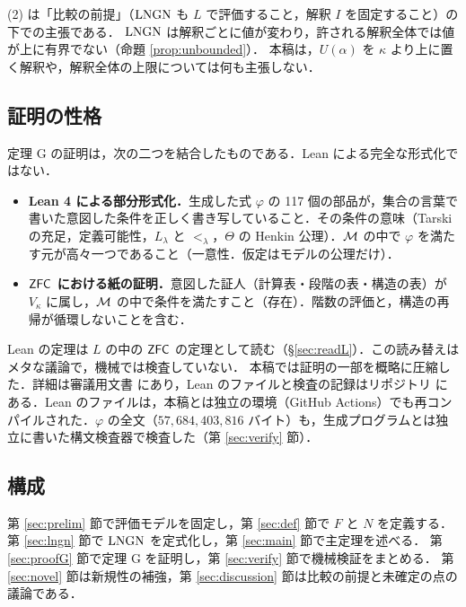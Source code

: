 (2) は「比較の前提」（$\mathrm{LNGN}$ も $L$ で評価すること，解釈 $I$ を固定すること）の下での主張である．
$\mathrm{LNGN}$ は解釈ごとに値が変わり，許される解釈全体では値が上に有界でない（命題 \ref{prop:unbounded}）．
本稿は，$U(\alpha)$ を $\kappa$ より上に置く解釈や，解釈全体の上限については何も主張しない．

\subsection{証明の性格}
定理 G の証明は，次の二つを結合したものである．Lean による完全な形式化ではない．
\begin{itemize}
\item \textbf{Lean 4 による部分形式化．}生成した式 $\varphi$ の 117 個の部品が，集合の言葉で書いた意図した条件を正しく書き写していること．その条件の意味（Tarski の充足，定義可能性，$L_\lambda$ と $<_\lambda$，$\Theta$ の Henkin 公理）．$\mathcal{M}$ の中で $\varphi$ を満たす元が高々一つであること（一意性．仮定はモデルの公理だけ）．
\item \textbf{$\mathsf{ZFC}$ における紙の証明．}意図した証人（計算表・段階の表・構造の表）が $V_\kappa$ に属し，$\mathcal{M}$ の中で条件を満たすこと（存在）．階数の評価と，構造の再帰が循環しないことを含む．
\end{itemize}
Lean の定理は $L$ の中の $\mathsf{ZFC}$ の定理として読む（\S\ref{sec:readL}）．この読み替えはメタな議論で，機械では検査していない．
本稿では証明の一部を概略に圧縮した．詳細は審議用文書 \cite{doc} にあり，Lean のファイルと検査の記録はリポジトリ \cite{repo} にある．Lean のファイルは，本稿とは独立の環境（GitHub Actions）でも再コンパイルされた．$\varphi$ の全文（$57{,}684{,}403{,}816$ バイト）も，生成プログラムとは独立に書いた構文検査器で検査した（第 \ref{sec:verify} 節）．

\subsection{構成}
第 \ref{sec:prelim} 節で評価モデルを固定し，第 \ref{sec:def} 節で $F$ と $N$ を定義する．
第 \ref{sec:lngn} 節で $\mathrm{LNGN}$ を定式化し，第 \ref{sec:main} 節で主定理を述べる．
第 \ref{sec:proofG} 節で定理 G を証明し，第 \ref{sec:verify} 節で機械検証をまとめる．
第 \ref{sec:novel} 節は新規性の補強，第 \ref{sec:discussion} 節は比較の前提と未確定の点の議論である．
